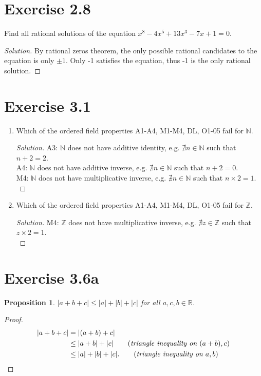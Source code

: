 \documentclass{article}
\newtheorem{proposition}[thm]{Proposition}
\begin{document}
\section*{Exercise 2.8}
Find all rational solutions of the equation $x^8 - 4x^5 + 13x^3 - 7x + 1 =0$.

\begin{proof}[Solution]
    By rational zeros theorem, the only possible rational candidates to the equation is only 
    $\pm 1$. Only -1 satisfies the equation, thus -1 is the only rational solution.
\end{proof}

\section*{Exercise 3.1}
    \begin{enumerate}[label=(\alph*)]
        \item Which of the ordered field properties A1-A4, M1-M4, DL, O1-05 fail for $\mathbb{N}$.
        \begin{proof}[Solution]
            A3: $\mathbb{N}$ does not have additive identity, e.g. $\nexists n \in\mathbb{N}$ such 
            that $n + 2 = 2$. \\
            A4: $\mathbb{N}$ does not have additive inverse, e.g. $\nexists n \in\mathbb{N}$ such 
            that $n + 2 = 0$. \\
            M4: $\mathbb{N}$ does not have multiplicative inverse, e.g. $\nexists n \in\mathbb{N}$ 
            such that $n \times 2 = 1$. \\ 
        \end{proof}

        \item Which of the ordered field properties A1-A4, M1-M4, DL, O1-05 fail for $\mathbb{Z}$.
        \begin{proof}[Solution]
            M4: $\mathbb{Z}$ does not have multiplicative inverse, e.g. $\nexists z \in\mathbb{Z}$ 
            such that $z \times 2 = 1$. \\
        \end{proof}
    \end{enumerate}

\section*{Exercise 3.6a}
\begin{proposition}
    $|a+b+c|\le |a|+|b|+|c|$ for all $a,c,b \in \mathbb{R}$.
\end{proposition}
\begin{proof}
    \begin{align*}
        |a+b+c| & = |(a+b)+c| \\
        & \le |a+b| + |c| \qquad (\emph{triangle inequality on } (a +b), c) \\
        & \le |a| + |b| + |c|. \qquad (\emph{triangle inequality on } a, b)
    \end{align*}
\end{proof}
\end{document}
